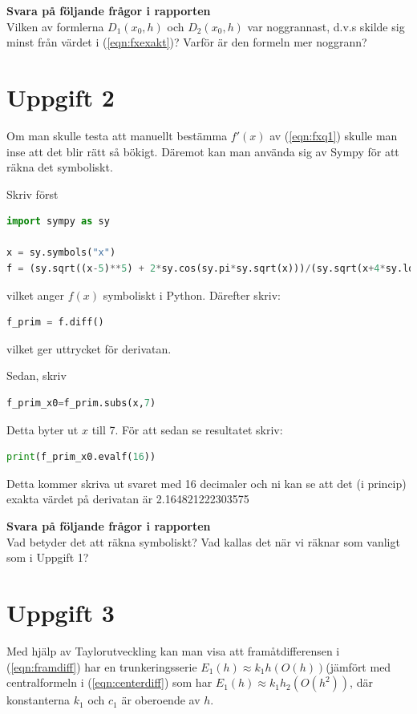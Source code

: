 \documentclass[a4paper]{article}
\begin{document}
\textbf{Svara på följande frågor i rapporten}\\
Vilken av formlerna  \( D_1(x_0,h) \) och  \( D_2(x_0,h) \) var noggrannast,
d.v.s skilde sig minst från värdet i (\ref{eqn:fxexakt})? Varför är den formeln mer noggrann?


\section{Uppgift 2}
Om man skulle testa att manuellt bestämma \( f'(x) \) av (\ref{eqn:fxq1})
skulle man inse att det blir rätt så bökigt. Däremot kan man använda sig av Sympy för att räkna det symboliskt.

Skriv först
\begin{lstlisting}[language=Python]
import sympy as sy

x = sy.symbols("x")
f = (sy.sqrt((x-5)**5) + 2*sy.cos(sy.pi*sy.sqrt(x)))/(sy.sqrt(x+4*sy.log(x-sy.pi))-1))
\end{lstlisting}
vilket anger \( f(x) \) symboliskt i Python. Därefter skriv:

\begin{lstlisting}[language=Python]
  f_prim = f.diff()
\end{lstlisting}
vilket ger uttrycket för derivatan.

Sedan, skriv

\begin{lstlisting}[language=Python]
  f_prim_x0=f_prim.subs(x,7)
\end{lstlisting}
Detta byter ut \(x\)  till 7. För att sedan se resultatet skriv:

\begin{lstlisting}[language=Python]
  print(f_prim_x0.evalf(16))
\end{lstlisting}
Detta kommer skriva ut svaret med 16 decimaler och ni kan se
att det (i princip) exakta värdet på derivatan är 2.164821222303575


\textbf{Svara på följande frågor i rapporten}\\
Vad betyder det att räkna symboliskt?
Vad kallas det när vi räknar som vanligt som i Uppgift 1?

\newpage
\section{Uppgift 3}

Med hjälp av Taylorutveckling kan man visa att framåtdifferensen i (\ref{eqn:framdiff}) har
en trunkeringsserie \( E_1(h)\approx k_1h(O(h)) \)(jämfört med centralformeln i (\ref{eqn:centerdiff})
som har \(E_1(h)\approx k_1h_2(O(h^2))\), där konstanterna \(k_1\)  och \(c_1\)  är oberoende av \(h\).
\end{document}
